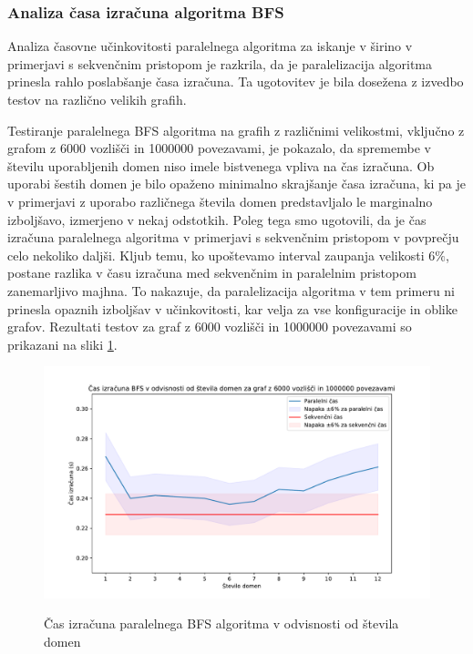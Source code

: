 \documentclass[fin1, tisk]{fmfdelo}
\begin{document}
\subsubsection{Analiza časa izračuna algoritma BFS}

Analiza časovne učinkovitosti paralelnega algoritma za iskanje v širino v primerjavi s sekvenčnim pristopom je
razkrila, da je paralelizacija algoritma prinesla rahlo poslabšanje časa izračuna.
Ta ugotovitev je bila dosežena z izvedbo testov na različno velikih grafih.

Testiranje paralelnega BFS algoritma na grafih z različnimi velikostmi, vključno z grafom z 6000 vozlišči in 1000000 povezavami,
je pokazalo, da spremembe v številu uporabljenih domen niso imele bistvenega vpliva na čas izračuna.
Ob uporabi šestih domen je bilo opaženo minimalno skrajšanje časa izračuna, ki pa je v primerjavi z uporabo različnega števila domen predstavljalo
le marginalno izboljšavo, izmerjeno v nekaj odstotkih. Poleg tega smo ugotovili, da je čas izračuna paralelnega algoritma v primerjavi s sekvenčnim
pristopom v povprečju celo nekoliko daljši. 
Kljub temu, ko upoštevamo interval zaupanja velikosti $6\%$, postane razlika v času izračuna med sekvenčnim in paralelnim pristopom zanemarljivo majhna.
To nakazuje, da paralelizacija algoritma v tem primeru ni prinesla opaznih izboljšav v učinkovitosti, kar velja za vse konfiguracije in oblike grafov.
Rezultati testov za graf z 6000 vozlišči in 1000000 povezavami so prikazani na sliki \ref{fig:bfs_calculation_time_by_num_domains}.

\begin{figure}[h!]
  \centering
  \caption{Čas izračuna paralelnega BFS algoritma v odvisnosti od števila domen}
  \includegraphics[width=15cm]{slike/bfs_v_odvisnosti_od_stevila_domen.pdf}
  \label{fig:bfs_calculation_time_by_num_domains}
\end{figure}
\end{document}
